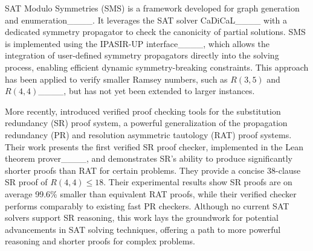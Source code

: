 SAT Modulo Symmetries (SMS) is a framework developed for graph generation and enumeration____.
It leverages the SAT solver CaDiCaL____ with a dedicated symmetry propagator to check the canonicity of partial solutions. SMS is implemented using the IPASIR-UP interface____, which allows the integration of user-defined symmetry propagators directly into the solving process, enabling efficient dynamic symmetry-breaking constraints.
This approach has been applied to verify smaller Ramsey numbers, such as $R(3,5)$ and $R(4,4)$____, but has not yet been extended to larger instances. %

More recently,  introduced verified proof checking tools for the substitution redundancy (SR) proof system,
a powerful generalization of the propagation redundancy (PR) and resolution asymmetric tautology (RAT) proof systems.
Their work presents the first verified SR proof checker, implemented in the Lean theorem prover____,
and demonstrates SR's ability to produce significantly shorter proofs than RAT for certain problems.
They provide a concise 38-clause SR proof of $R(4,4) \leq 18$. Their experimental results show SR proofs are on average 99.6\% smaller than equivalent RAT proofs, while their verified checker performs comparably to existing fast PR checkers. Although no current SAT solvers support SR reasoning, this work lays the groundwork for potential advancements in SAT solving techniques, offering a path to more powerful reasoning and shorter proofs for complex problems.

